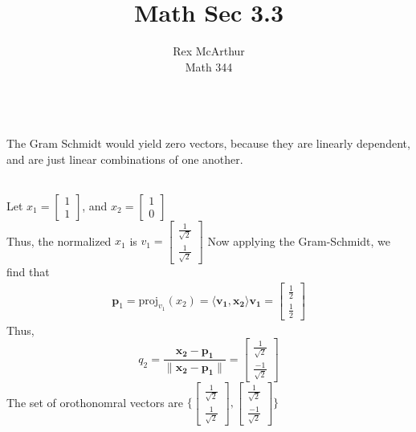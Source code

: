 \documentclass[letterpaper,12pt]{article}
\title{Math Sec 3.3}
\author{Rex McArthur\\Math 344}
\theoremstyle{definition}
\begin{document}
\maketitle
{}\\
The Gram Schmidt would yield zero vectors, because they are linearly dependent, and are just linear combinations of one another.

\\
Let $x_1 = \begin{bmatrix} 1 \\ 1 \end{bmatrix}$, and $x_2 = \begin{bmatrix} 1 \\ 0 \end{bmatrix}$\\
Thus, the normalized $x_1$ is $v_1 = \begin{bmatrix} \frac{1}{\sqrt{2}} \\ \frac{1}{\sqrt{2}} 
\end{bmatrix}$ Now applying the Gram-Schmidt, we find that \\
\begin{align}
    \mathbf{p}_1 = \text{proj}_{v_1}(x_2) = \langle \mathbf{v_1}, \mathbf{x_2} \rangle \mathbf{v_1} =  \begin{bmatrix} \frac{1}{2} \\ \frac{1}{2} \end{bmatrix}
\end{align}
Thus, 
\[
q_2 = \frac{\mathbf{x_2} - \mathbf{p_1}}{\|\mathbf{x_2} - \mathbf{p_1}\|} = \begin{bmatrix} \frac{1}{\sqrt{2}} \\ \frac{-1}{\sqrt{2}} \end{bmatrix}
\]
The set of orothonomral vectors are $\big\{ \begin{bmatrix} \frac{1}{\sqrt{2}} \\ \frac{1}{\sqrt{2}}\end{bmatrix}, \begin{bmatrix} \frac{1}{\sqrt{2}} \\ \frac{-1}{\sqrt{2}} \end{bmatrix} \big\}$
\end{document}
